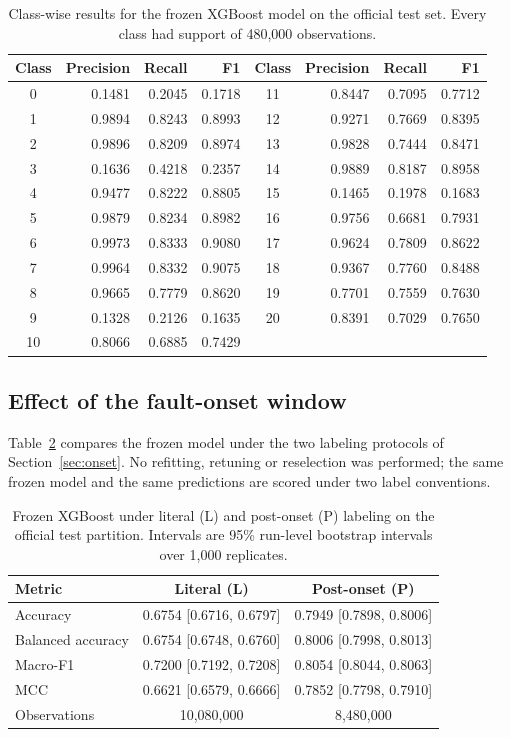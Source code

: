 \documentclass[10pt,twocolumn,a4paper]{article}
\begin{document}
\begin{table}[t]
\centering
\caption{Class-wise results for the frozen XGBoost model on the official test
set. Every class had support of 480,000 observations.}
\label{tab:classwise}
\small
\begin{tabular}{crrr@{\qquad}crrr}
\toprule
Class & Precision & Recall & F1 & Class & Precision & Recall & F1\\
\midrule
0  & 0.1481 & 0.2045 & 0.1718 & 11 & 0.8447 & 0.7095 & 0.7712\\
1  & 0.9894 & 0.8243 & 0.8993 & 12 & 0.9271 & 0.7669 & 0.8395\\
2  & 0.9896 & 0.8209 & 0.8974 & 13 & 0.9828 & 0.7444 & 0.8471\\
3  & 0.1636 & 0.4218 & 0.2357 & 14 & 0.9889 & 0.8187 & 0.8958\\
4  & 0.9477 & 0.8222 & 0.8805 & 15 & 0.1465 & 0.1978 & 0.1683\\
5  & 0.9879 & 0.8234 & 0.8982 & 16 & 0.9756 & 0.6681 & 0.7931\\
6  & 0.9973 & 0.8333 & 0.9080 & 17 & 0.9624 & 0.7809 & 0.8622\\
7  & 0.9964 & 0.8332 & 0.9075 & 18 & 0.9367 & 0.7760 & 0.8488\\
8  & 0.9665 & 0.7779 & 0.8620 & 19 & 0.7701 & 0.7559 & 0.7630\\
9  & 0.1328 & 0.2126 & 0.1635 & 20 & 0.8391 & 0.7029 & 0.7650\\
10 & 0.8066 & 0.6885 & 0.7429 & & & &\\
\bottomrule
\end{tabular}
\end{table}

\subsection{Effect of the fault-onset window}
\label{sec:onseteffect}

Table~\ref{tab:onset} compares the frozen model under the two labeling
protocols of Section~\ref{sec:onset}. No refitting, retuning or reselection was
performed; the same frozen model and the same predictions are scored under two
label conventions.

\begin{table}[t]
\centering
\caption{Frozen XGBoost under literal (L) and post-onset (P) labeling on the
official test partition. Intervals are 95\% run-level bootstrap intervals over
1,000 replicates.}
\label{tab:onset}
\small
\begin{tabular}{lcc}
\toprule
Metric & Literal (L) & Post-onset (P)\\
\midrule
Accuracy          & 0.6754 [0.6716, 0.6797] & 0.7949 [0.7898, 0.8006]\\
Balanced accuracy & 0.6754 [0.6748, 0.6760] & 0.8006 [0.7998, 0.8013]\\
Macro-F1          & 0.7200 [0.7192, 0.7208] & 0.8054 [0.8044, 0.8063]\\
MCC               & 0.6621 [0.6579, 0.6666] & 0.7852 [0.7798, 0.7910]\\
Observations      & 10,080,000 & 8,480,000\\
\bottomrule
\end{tabular}
\end{table}
\end{document}
